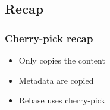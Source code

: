 \subsection{Recap}
\begin{frame}
    \frametitle{Cherry-pick recap}
    \begin{itemize}
        \item Only copies the content
        \item Metadata are copied
        \item Rebase uses cherry-pick
    \end{itemize}
\end{frame}

